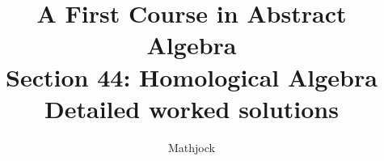 
\title{\textbf{A First Course in Abstract Algebra}\\[0.3em]Section 44: Homological Algebra\\[0.3em]\large Detailed worked solutions}
\author{Mathjock}
\date{}

\maketitle
\bookinfo
\tableofcontents
\clearpage
\renewcommand{\thesection}{44}
\renewcommand{\theHsection}{fraleigh.44}


